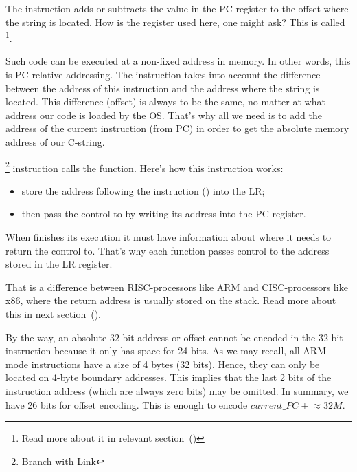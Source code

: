 \myindex{\PICcode}
The 
instruction adds or subtracts the value in the \ac{PC} register to the offset where the  string is located.
How is the  register used here, one might ask?
This is called \q{\PICcode}\footnote{Read more about it in relevant section~()}.

Such code can be executed at a non-fixed address in memory.
In other words, this is \ac{PC}-relative addressing.
The  instruction takes into account the difference between the address of this instruction and the address where the string is located.
This difference (offset) is always to be the same, no matter at what address our code is loaded by the \ac{OS}.
That's why all we need is to add the address of the current instruction (from \ac{PC}) in order to get the absolute memory address of our C-string.

\footnote{Branch with Link} instruction calls the \printf function. 
Here's how this instruction works: 

\begin{itemize}
\item store the address following the  instruction () into the \ac{LR};
\item then pass the control to \printf by writing its address into the \ac{PC} register.
\end{itemize}

When \printf finishes its execution it must have information about where it needs to return the control to.
That's why each function passes control to the address stored in the \ac{LR} register.

That is a difference between  \ac{RISC}-processors like ARM and \ac{CISC}-processors like x86,
where the return address is usually stored on the stack.
Read more about this in next section~().

By the way, an absolute 32-bit address or offset cannot be encoded in the 32-bit  instruction because
it only has space for 24 bits.
As we may recall, all ARM-mode instructions have a size of 4 bytes (32 bits).
Hence, they can only be located on 4-byte boundary addresses.
This implies that the last 2 bits of the instruction address (which are always zero bits) may be omitted.
In summary, we have 26 bits for offset encoding. This is enough to encode $current\_PC \pm{} \approx{}32M$.

